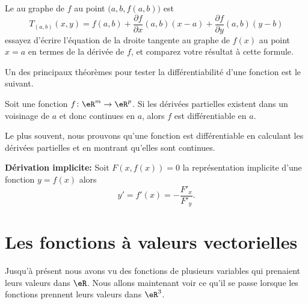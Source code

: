 Le  au graphe de \( f\) au point \( \big(a,b,f(a,b)\big)\) est
\begin{equation}
	T_{(a,b)}(x,y) = f(a,b) + \frac{\partial f}{\partial x}(a,b) (x-a) + \frac{\partial f}{\partial y}(a,b) (y-b)
\end{equation}
essayez d'écrire l'équation de la droite tangente au graphe de \( f(x)\) au point \( x=a\) en termes de la dérivée de \( f\), et comparez votre résultat à cette formule.

Un des principaux théorèmes pour tester la différentiabilité d'une fonction est le suivant.

\begin{theorem}		\label{ThoProuverDiffable}
	Soit une fonction \( f\colon \eR^m\to \eR^p\). Si les dérivées partielles existent dans un voisinage de \( a\) et donc continues en \( a\), alors \( f\) est différentiable en \( a\).
\end{theorem}
Le plus souvent, nous prouvons qu'une fonction est différentiable en calculant les dérivées partielles et en montrant qu'elles sont continues.

\textbf{Dérivation implicite:} Soit \( F(x,f(x)) = 0\) la représentation implicite d'une fonction \( y=f(x)\) alors \[y' = f'(x) = - \frac{F'_x}{F'_y}.\]


\section{Les fonctions à valeurs vectorielles}

Jusqu'à présent nous avons vu des fonctions de plusieurs variables qui prenaient leurs valeurs dans \( \eR\). Nous allons maintenant voir ce qu'il se passe lorsque les fonctions prennent leurs valeurs dans \( \eR^3\).

